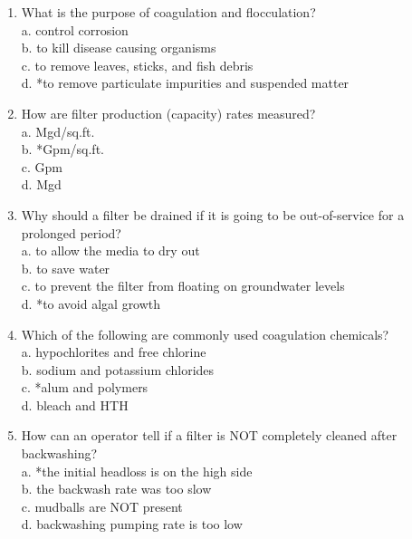 \begin{enumerate}











  \item What is the purpose of coagulation and flocculation?\\
a. control corrosion\\
b. to kill disease causing organisms\\
c. to remove leaves, sticks, and fish debris\\
d. *to remove particulate impurities and suspended matter\\
  \item How are filter production (capacity) rates measured?\\
a. Mgd/sq.ft.\\
b. *Gpm/sq.ft.\\
c. Gpm\\
d. Mgd\\
  \item Why should a filter be drained if it is going to be out-of-service for a prolonged period?\\
a. to allow the media to dry out\\
b. to save water\\
c. to prevent the filter from floating on groundwater levels\\
d. *to avoid algal growth\\

  \item Which of the following are commonly used coagulation chemicals?\\
a. hypochlorites and free chlorine\\
b. sodium and potassium chlorides\\
c. *alum and polymers\\
d. bleach and HTH\\
  \item How can an operator tell if a filter is NOT completely cleaned after backwashing?\\
a. *the initial headloss is on the high side\\
b. the backwash rate was too slow\\
c. mudballs are NOT present\\
d. backwashing pumping rate is too low\\


\end{enumerate}

